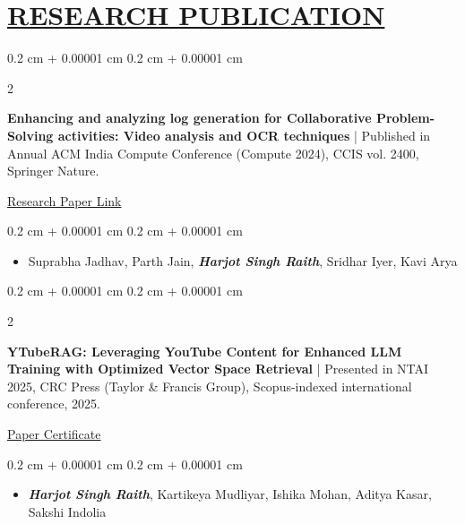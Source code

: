\documentclass[10pt, letterpaper]{article}
\newenvironment{highlights}{
    \begin{itemize}[
        topsep=0.05 cm,
        parsep=0 cm,
        partopsep=0pt,
        itemsep=0pt,
        leftmargin=0.4 cm + 10pt
    ]
}{
    \end{itemize}
} %
\newenvironment{onecolentry}{
    \begin{adjustwidth}{
        0.2 cm + 0.00001 cm
    }{
        0.2 cm + 0.00001 cm
    }
}{
    \end{adjustwidth}
} %
\newenvironment{twocolentry}[2][]{
    \onecolentry
    \def\secondColumn{#2}
    \setcolumnwidth{\fill, 5.0 cm}
    \begin{paracol}{2}
}{
    \switchcolumn \raggedleft \secondColumn
    \end{paracol}
    \endonecolentry
} %
\begin{document}
     

       

   \section{\href{https://www.harjot.info/\#Publications}{RESEARCH PUBLICATION}}
       
\begin{samepage}
    \begin{twocolentry}{
        \href{https://link.springer.com/chapter/10.1007/978-3-031-84391-4_11}{Research Paper Link}}
        \textbf{Enhancing and analyzing log generation for Collaborative Problem-Solving activities: Video analysis and OCR techniques} | Published in Annual ACM India Compute Conference (Compute 2024), CCIS vol. 2400, Springer Nature.
    \end{twocolentry}
    
    \vspace{0.05 cm}
    \begin{onecolentry}
        \begin{highlights}
            \item Suprabha Jadhav, Parth Jain, \textbf{\textit{Harjot Singh Raith}}, Sridhar Iyer, Kavi Arya 
        \end{highlights}
    \end{onecolentry}
    
    \vspace{0.2 cm}
    
    \begin{twocolentry}{
        \href{https://drive.google.com/file/d/1OGv0QIKzG9IgbJINtoNc8RhLQ6HJT8bL/view?usp=drive_link}{Paper Certificate}}
        \textbf{YTubeRAG: Leveraging YouTube Content for Enhanced LLM Training with Optimized Vector Space Retrieval} | Presented in NTAI 2025, CRC Press (Taylor \& Francis Group), Scopus-indexed international conference, 2025.
    \end{twocolentry}
    
    \vspace{0.05 cm}
    \begin{onecolentry}
        \begin{highlights}
            \item \textbf{\textit{Harjot Singh Raith}}, Kartikeya Mudliyar, Ishika Mohan, Aditya Kasar, Sakshi Indolia 
        \end{highlights}
    \end{onecolentry}
    

\end{samepage}
\end{document}
